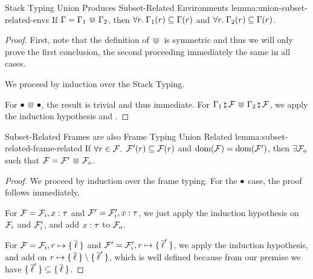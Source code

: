 \begin{oxlemma}{Stack Typing Union Produces Subset-Related Environments}
  {lemma:union-subset-related-envs}
  If $\Gamma = \Gamma_1 \, \Cup \, \Gamma_2$, then
  $\forall r. \; \Gamma_1(r) \subseteq \Gamma(r)$ and
  $\forall r. \; \Gamma_2(r) \subseteq \Gamma(r)$.
\end{oxlemma}

\begin{proof}
  First, note that the definition of $\, \Cup \,$ is symmetric and thus we will only
  prove the first conclusion, the second proceeding immediately the same in all cases.

  We proceed by induction over the Stack Typing. 

  For $\bullet \, \Cup \, \bullet$, the result is trivial and thus
  immediate. For $\Gamma_1 \, \natural \, \mathcal{F} \, \Cup \,
  \Gamma_2 \, \natural \, \mathcal{F}$, we apply the induction hypothesis and
  .
\end{proof}

\begin{oxlemma}{Subset-Related Frames are also Frame Typing Union Related}
  {lemma:subset-related-frame-related} If $\forall r \in \mathcal{F}.$
  $\mathcal{F}^\prime(r) \subseteq \mathcal{F}(r)$ and
  $\textrm{dom}(\mathcal{F}) = \textrm{dom}(\mathcal{F}^\prime)$, then $\exists \mathcal{F}_o$ such
  that $\mathcal{F} = \mathcal{F}^\prime \, \Cup \, \mathcal{F}_o$.
\end{oxlemma}

\begin{proof}
  We proceed by induction over the frame typing. For the $\bullet$ case, the
  proof follows immediately.

  For $\mathcal{F} = \mathcal{F}_i, x : \tau$ and $\mathcal{F}^\prime =
  \mathcal{F}_i^\prime, x : \tau$, we just apply the induction hypothesis
  on $\mathcal{F}_i$ and $\mathcal{F}_i^\prime$, and add $x : \tau$ to
  $\mathcal{F}_o$.

  For $\mathcal{F} = \mathcal{F}_i, r \mapsto \{ \: \overline{\ell} \: \}$ and
  $\mathcal{F}^\prime = \mathcal{F}_i^\prime, r \mapsto
  \{ \: \overline{\ell}^\prime \: \}$, we apply the induction hypothesis, and add on
  $r \mapsto \{ \: \overline{\ell} \: \} \setminus \{ \: \overline{\ell}^\prime \: \}$, which
  is well defined because from our premise we have $\{ \: \overline{\ell}^\prime \: \}
  \subseteq \{ \: \overline{\ell} \: \}$.
\end{proof}
    

